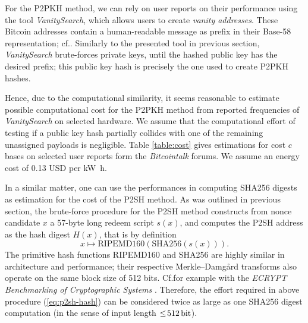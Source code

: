 \documentclass[a4paper,11pt,titlepage]{scrbook}
\begin{document}
For the {P2PKH} method, we can rely on user reports on their performance using the tool \emph{VanitySearch}, which allows users to create \emph{vanity addresses}.
These Bitcoin addresses contain a human-readable message as prefix in their Base-58 representation; cf.\@ \cite[82--83]{antonopoulos_mastering_2017}.
Similarly to the presented tool in previous section, \emph{VanitySearch} brute-forces private keys, until the hashed public key has the desired prefix;
this public key hash is precisely the one used to create {P2PKH} hashes.

Hence, due to the computational similarity, it seems reasonable to estimate possible computational cost for the {P2PKH} method from reported frequencies of \emph{VanitySearch} on selected hardware.
We assume that the computational effort of testing if a public key hash partially collides with one of the remaining unassigned payloads is negligible.
Table \ref{table:cost} gives estimations for cost $c$ bases on selected user reports form the \emph{Bitcointalk} forums.
We assume an energy cost of \num{.13} USD per \si{\kilo\watt\hour}. 

In a similar matter, one can use the performances in computing {SHA256} digests as estimation for the cost of the {P2SH} method.
As was outlined in previous section, the brute-force procedure for the {P2SH} method constructs from nonce candidate $x$ a 57-byte long redeem script $s(x)$, and computes the {P2SH} address as the hash digest $H(x)$, that is by definition
\begin{equation}
    x \mapsto \text{{RIPEMD160}}(\text{{SHA256}}(s(x))).\label{eq:p2sh-hash}
\end{equation}
The primitive hash functions {RIPEMD160} and {SHA256} are highly similar in architecture and performance; their respective Merkle–Damgård transforms also operate on the same block size of 512 bits. 
Cf.\@ for example with the \emph{ECRYPT Benchmarking of Cryptographic Systems} \cite{bernstein_benchmark}.
Therefore, the effort required in above procedure (\ref{eq:p2sh-hash}) can be considered twice as large as one {SHA256} digest computation (in the sense of input length $\leq\!\SI{512}{\bit}$). 
\end{document}
